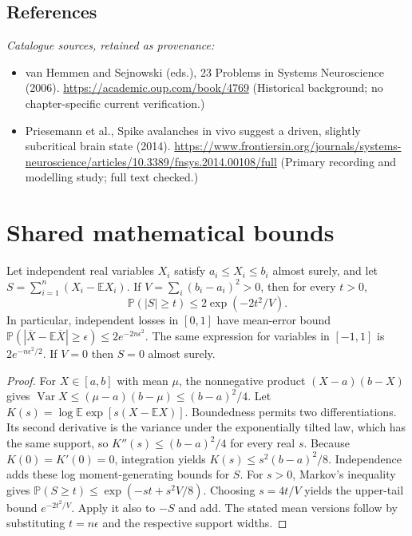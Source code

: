 \documentclass[11pt]{article}
\begin{document}
\subsection{References}
\noindent\emph{Catalogue sources, retained as provenance:}
\begin{itemize}
\item van Hemmen and Sejnowski (eds.), 23 Problems in Systems Neuroscience (2006). \url{https://academic.oup.com/book/4769} (Historical background; no chapter-specific current verification.)
\item Priesemann et al., Spike avalanches in vivo suggest a driven, slightly subcritical brain state (2014). \url{https://www.frontiersin.org/journals/systems-neuroscience/articles/10.3389/fnsys.2014.00108/full} (Primary recording and modelling study; full text checked.)
\end{itemize}




\section{Shared mathematical bounds}\label{app:bounds}
\begin{lemma}\label{lem:bounded}
Let independent real variables $X_i$ satisfy $a_i\leq X_i\leq b_i$ almost surely,
and let $S=\sum_{i=1}^n(X_i-\mathbb{E} X_i)$. If
$V=\sum_i(b_i-a_i)^2>0$, then for every $t>0$,
\[
 \mathbb{P}(|S|\geq t)\leq 2\exp(-2t^2/V).
\]
In particular, independent losses in $[0,1]$ have mean-error bound
$\mathbb{P}(|\overline X-\mathbb{E}\overline X|\geq\epsilon)
\leq2e^{-2n\epsilon^2}$. The same expression for variables in $[-1,1]$
is $2e^{-n\epsilon^2/2}$. If $V=0$ then $S=0$ almost surely.
\end{lemma}
\begin{proof}
For $X\in[a,b]$ with mean $\mu$, the nonnegative product
$(X-a)(b-X)$ gives
$\operatorname{Var} X\leq(\mu-a)(b-\mu)\leq(b-a)^2/4$.
Let $K(s)=\log\mathbb{E}\exp[s(X-\mathbb{E} X)]$.
Boundedness permits two differentiations. Its second derivative is the variance
under the exponentially tilted law, which has the same support, so
$K''(s)\leq(b-a)^2/4$ for every real $s$.
Because $K(0)=K'(0)=0$, integration yields
$K(s)\leq s^2(b-a)^2/8$.
Independence adds these log moment-generating bounds for $S$.
For $s>0$, Markov's inequality gives
$\mathbb{P}(S\geq t)\leq\exp(-st+s^2V/8)$.
Choosing $s=4t/V$ yields the upper-tail bound $e^{-2t^2/V}$.
Apply it also to $-S$ and add. The stated mean versions follow by substituting
$t=n\epsilon$ and the respective support widths.
\end{proof}
\end{document}
